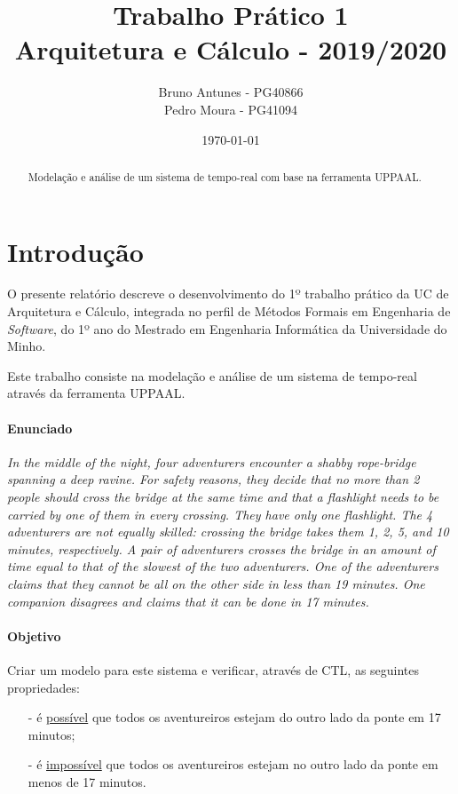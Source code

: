 \documentclass[12pt]{extarticle}
\title{Trabalho Prático 1\\
       \large{Arquitetura e Cálculo - 2019/2020}}
\author{Bruno Antunes - PG40866\\
        Pedro Moura - PG41094}
\date{\today}
\begin{document}
\maketitle


\begin{abstract}
	Modelação e análise de um sistema de tempo-real com base na ferramenta UPPAAL.
\end{abstract}


\tableofcontents

\newpage

\section{Introdução}
O presente relatório descreve o desenvolvimento do 1º trabalho prático da UC de Arquitetura e Cálculo, integrada no perfil de Métodos Formais em Engenharia de \textit{Software}, do 1º ano do Mestrado em Engenharia Informática da Universidade do Minho.

Este trabalho consiste na modelação e análise de um sistema de tempo-real através da ferramenta UPPAAL.

\paragraph{Enunciado}{\textit{
	In the middle of the night, four adventurers encounter a shabby rope-bridge spanning a deep ravine.
	For safety reasons, they decide that no more than 2 people should cross the bridge at the same
	time and that a flashlight needs to be carried by one of them in every crossing. They have only
	one flashlight. The 4 adventurers are not equally skilled: crossing the bridge takes them 1, 2, 5,
	and 10 minutes, respectively. A pair of adventurers crosses the bridge in an amount of time equal
	to that of the slowest of the two adventurers.
	One of the adventurers claims that they cannot be all on the other side in less than 19 minutes.
	One companion disagrees and claims that it can be done in 17 minutes.
}}

\paragraph{Objetivo}{
	Criar um modelo para este sistema e verificar, através de CTL, as seguintes propriedades:
	\begin{itemize}
		\item[-] é \underline{possível} que todos os aventureiros estejam do outro lado da ponte em 17 minutos;
		\item[-] é \underline{impossível} que todos os aventureiros estejam no outro lado da ponte em menos de 17 minutos.
	\end{itemize}
}
\end{document}

